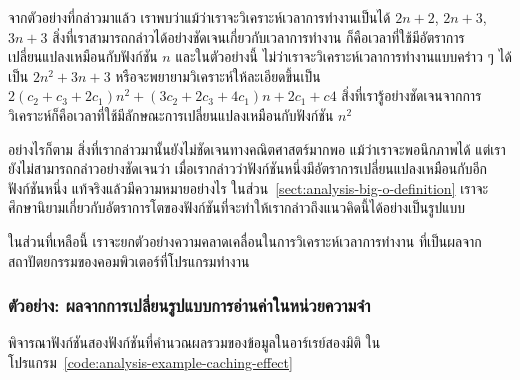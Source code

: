 จาก{\wbr}ตัวอย่าง{\wbr}ที่{\wbr}กล่าว{\wbr}มา{\wbr}แล้ว เรา{\wbr}พบ{\wbr}ว่า{\wbr}แม้ว่า{\wbr}เรา{\wbr}จะ{\wbr}วิเคราะห์{\wbr}เวลา{\wbr}การ{\wbr}ทำงาน{\wbr}เป็น{\wbr}ได้ $2n+2$,
$2n+3$, $3n+3$ สิ่ง{\wbr}ที่{\wbr}เรา{\wbr}สามารถ{\wbr}กล่าว{\wbr}ได้{\wbr}อย่าง{\wbr}ชัดเจน{\wbr}เกี่ยวกับ{\wbr}เวลา{\wbr}การ{\wbr}ทำงาน{\wbr}
ก็{\wbr}คือ{\wbr}เวลา{\wbr}ที่{\wbr}ใช้{\wbr}มี{\wbr}อัตรา{\wbr}การ{\wbr}เปลี่ยนแปลง{\wbr}เหมือน{\wbr}กับ{\wbr}ฟังก์ชัน $n$ และ{\wbr}ใน{\wbr}ตัวอย่าง{\wbr}นี้{\wbr}
ไม่ว่า{\wbr}เรา{\wbr}จะ{\wbr}วิเคราะห์{\wbr}เวลา{\wbr}การ{\wbr}ทำงาน{\wbr}แบบ{\wbr}คร่าว ๆ ได้{\wbr}เป็น $2n^2+3n+3$
หรือ{\wbr}จะ{\wbr}พยายาม{\wbr}วิเคราะห์{\wbr}ให้{\wbr}ละเอียด{\wbr}ขึ้น{\wbr}เป็น $2(c_2+c_3+2c_1)n^2 + (3c_2 + 2c_3 +
4c_1)n + 2c_1 + c4$
สิ่ง{\wbr}ที่{\wbr}เรา{\wbr}รู้{\wbr}อย่าง{\wbr}ชัดเจน{\wbr}จาก{\wbr}การ{\wbr}วิเคราะห์{\wbr}ก็{\wbr}คือ{\wbr}เวลา{\wbr}ที่{\wbr}ใช้{\wbr}มี{\wbr}ลักษณะ{\wbr}การ{\wbr}เปลี่ยนแปลง{\wbr}เหมือน{\wbr}กับ{\wbr}ฟังก์ชัน{\wbr}
$n^2$

อย่างไรก็ตาม สิ่ง{\wbr}ที่{\wbr}เรา{\wbr}กล่าว{\wbr}มา{\wbr}นั้น{\wbr}ยัง{\wbr}ไม่{\wbr}ชัดเจน{\wbr}ทาง{\wbr}คณิตศาสตร์{\wbr}มาก{\wbr}พอ แม้ว่า{\wbr}เรา{\wbr}จะ{\wbr}พอ{\wbr}นึก{\wbr}ภาพ{\wbr}ได้{\wbr}
แต่{\wbr}เรา{\wbr}ยัง{\wbr}ไม่{\wbr}สามารถ{\wbr}กล่าว{\wbr}อย่าง{\wbr}ชัดเจน{\wbr}ว่า{\wbr}
เมื่อ{\wbr}เรา{\wbr}กล่าว{\wbr}ว่า{\wbr}ฟังก์ชัน{\wbr}หนึ่ง{\wbr}มี{\wbr}อัตรา{\wbr}การ{\wbr}เปลี่ยนแปลง{\wbr}เหมือน{\wbr}กับ{\wbr}อีก{\wbr}ฟังก์ชัน{\wbr}หนึ่ง{\wbr}
แท้จริง{\wbr}แล้ว{\wbr}มี{\wbr}ความหมาย{\wbr}อย่างไร ใน{\wbr}ส่วน~\ref{sect:analysis-big-o-definition}
เรา{\wbr}จะ{\wbr}ศึกษา{\wbr}นิยาม{\wbr}เกี่ยวกับ{\wbr}อัตรา{\wbr}การ{\wbr}โต{\wbr}ของ{\wbr}ฟังก์ชัน{\wbr}ที่{\wbr}จะ{\wbr}ทำ{\wbr}ให้{\wbr}เรา{\wbr}กล่าว{\wbr}ถึง{\wbr}แนว{\wbr}คิด{\wbr}นี้{\wbr}ได้{\wbr}อย่าง{\wbr}เป็น{\wbr}รูปแบบ{\wbr}

ใน{\wbr}ส่วน{\wbr}ที่{\wbr}เหลือ{\wbr}นี้ เรา{\wbr}จะ{\wbr}ยก{\wbr}ตัวอย่าง{\wbr}ความ{\wbr}คลาดเคลื่อน{\wbr}ใน{\wbr}การ{\wbr}วิเคราะห์{\wbr}เวลา{\wbr}การ{\wbr}ทำงาน{\wbr}
ที่{\wbr}เป็น{\wbr}ผล{\wbr}จาก{\wbr}สถาปัตยกรรม{\wbr}ของ{\wbr}คอมพิวเตอร์{\wbr}ที่{\wbr}โปรแกรม{\wbr}ทำงาน{\wbr}

\subsubsection{ตัวอย่าง: ผล{\wbr}จาก{\wbr}การ{\wbr}เปลี่ยน{\wbr}รูปแบบ{\wbr}การ{\wbr}อ่าน{\wbr}ค่า{\wbr}ใน{\wbr}หน่วยความจำ}

พิจารณา{\wbr}ฟังก์ชัน{\wbr}สอง{\wbr}ฟังก์ชัน{\wbr}ที่{\wbr}คำนวณ{\wbr}ผลรวม{\wbr}ของ{\wbr}ข้อมูล{\wbr}ใน{\wbr}อาร์เรย์{\wbr}สอง{\wbr}มิติ{\wbr}
ใน{\wbr}โปรแกรม~\ref{code:analysis-example-caching-effect}

